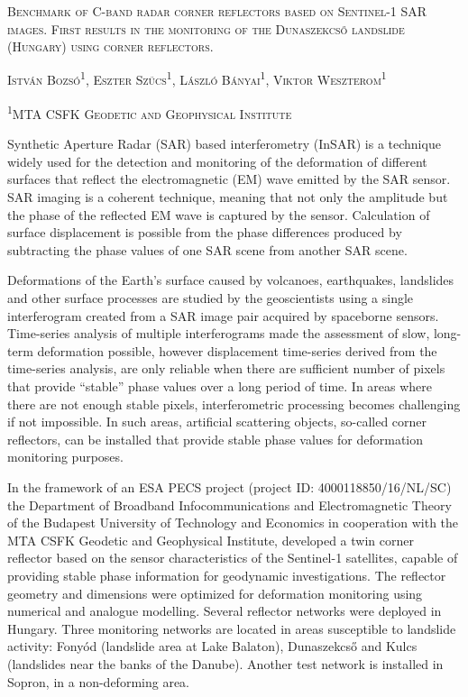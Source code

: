 \documentclass{article}
\begin{document}
\begin{center}
{\large \textsc{Benchmark of C-band radar corner reflectors based on Sentinel-1 SAR images. First results in the monitoring of the Dunaszekcső landslide (Hungary) using corner reflectors.} }

\vspace{10pt}

\textsc{István Bozsó\textsuperscript{1}, Eszter Szűcs\textsuperscript{1}, László Bányai\textsuperscript{1}, Viktor Weszterom\textsuperscript{1}}

\vspace{5pt}

\textsc{\textsuperscript{1}MTA CSFK Geodetic and Geophysical Institute}

\end{center}

\vspace{10pt}

Synthetic Aperture Radar (SAR) based interferometry (InSAR) is a technique widely used for the detection and monitoring of the deformation of different surfaces that reflect the electromagnetic (EM) wave emitted by the SAR sensor. SAR imaging is a coherent technique, meaning that not only the amplitude but the phase of the reflected EM wave is captured by the sensor. Calculation of surface displacement is possible from the phase differences produced by subtracting the phase values of one SAR scene from another SAR scene.

Deformations of the Earth’s surface caused by volcanoes, earthquakes, landslides and other surface processes are studied by the geoscientists using a single interferogram created from a SAR image pair acquired by spaceborne sensors. Time-series analysis of multiple interferograms made the assessment of slow, long-term deformation  possible, however displacement time-series derived from the time-series analysis, are only reliable when there are sufficient number of pixels that provide ``stable'' phase values over a long period of time. In areas where there are not enough stable pixels, interferometric processing becomes challenging if not impossible. In such areas, artificial scattering objects, so-called corner reflectors, can be installed that provide stable phase values for deformation monitoring purposes.

In the framework of an ESA PECS project (project ID: 4000118850/16/NL/SC) the Department of Broadband Infocommunications and Electromagnetic Theory of the Budapest University of Technology and Economics in cooperation with the MTA CSFK Geodetic and Geophysical Institute, developed a twin corner reflector based on the sensor characteristics of the Sentinel-1 satellites, capable of providing stable phase information for geodynamic investigations. The reflector geometry and dimensions were optimized for deformation monitoring using numerical and analogue modelling.
Several reflector networks were deployed  in Hungary. Three monitoring networks are located in areas susceptible to landslide activity: Fonyód (landslide area at Lake Balaton), Dunaszekcső and Kulcs (landslides near the banks of the Danube). Another test network is installed in Sopron, in a non-deforming area.
\end{document}
